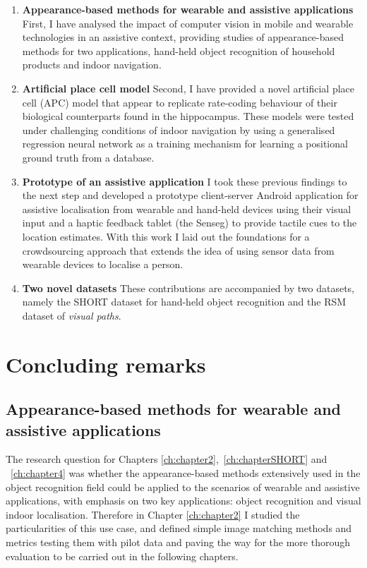 \begin{enumerate}
\item \textbf{Appearance-based methods for wearable and assistive applications} First, I have analysed the impact of computer vision in mobile and wearable technologies in an assistive context, providing studies of appearance-based methods for two applications, hand-held object recognition of household products and indoor navigation.

\item \textbf{Artificial place cell model} Second, I have provided a novel artificial place cell (APC) model that appear to replicate rate-coding behaviour of their biological counterparts found in the hippocampus. These models were tested under challenging conditions of indoor navigation by using a generalised regression neural network as a training mechanism for learning a positional ground truth from a database.

\item \textbf{Prototype of an assistive application} I took these previous findings to the next step and developed a prototype client-server Android application for assistive localisation from wearable and hand-held devices using their visual input and a haptic feedback tablet (the Senseg\texttrademark) to provide tactile cues to the location estimates. With this work I laid out the foundations for a crowdsourcing approach that extends the idea of using sensor data from wearable devices to localise a person.

\item \textbf{Two novel datasets} These contributions are accompanied by two datasets, namely the SHORT dataset for hand-held object recognition and the RSM dataset of \emph{visual paths}.
\end{enumerate}

\section{Concluding remarks}

\subsection{Appearance-based methods for wearable and assistive applications}

The research question for Chapters \ref{ch:chapter2},~\ref{ch:chapterSHORT} and ~\ref{ch:chapter4} was whether the appearance-based methods extensively used in the object recognition field could be applied to the scenarios of wearable and assistive applications, with emphasis on two key applications: object recognition and visual indoor localisation. Therefore in Chapter \ref{ch:chapter2} I studied the particularities of this use case, and defined simple image matching methods and metrics testing them with pilot data and paving the way for the more thorough evaluation to be carried out in the following chapters.

